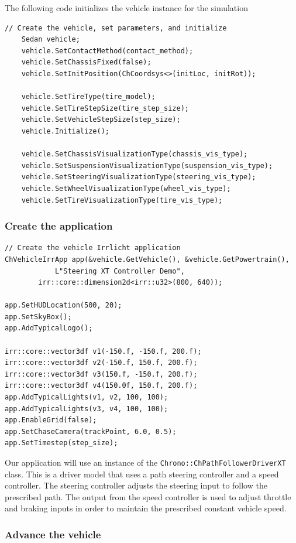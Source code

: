 The following code initializes the vehicle instance for the simulation

\begin{lstlisting}
// Create the vehicle, set parameters, and initialize
    Sedan vehicle;
    vehicle.SetContactMethod(contact_method);
    vehicle.SetChassisFixed(false);
    vehicle.SetInitPosition(ChCoordsys<>(initLoc, initRot));
    
    vehicle.SetTireType(tire_model);
    vehicle.SetTireStepSize(tire_step_size);
    vehicle.SetVehicleStepSize(step_size);
    vehicle.Initialize();

    vehicle.SetChassisVisualizationType(chassis_vis_type);
    vehicle.SetSuspensionVisualizationType(suspension_vis_type);
    vehicle.SetSteeringVisualizationType(steering_vis_type);
    vehicle.SetWheelVisualizationType(wheel_vis_type);
    vehicle.SetTireVisualizationType(tire_vis_type);
\end{lstlisting}


\subsubsection{Create the application}

\begin{lstlisting}
// Create the vehicle Irrlicht application
ChVehicleIrrApp app(&vehicle.GetVehicle(), &vehicle.GetPowertrain(), 
		    L"Steering XT Controller Demo", 
        irr::core::dimension2d<irr::u32>(800, 640));

app.SetHUDLocation(500, 20);
app.SetSkyBox();
app.AddTypicalLogo();

irr::core::vector3df v1(-150.f, -150.f, 200.f);
irr::core::vector3df v2(-150.f, 150.f, 200.f);
irr::core::vector3df v3(150.f, -150.f, 200.f);
irr::core::vector3df v4(150.0f, 150.f, 200.f); 
app.AddTypicalLights(v1, v2, 100, 100);
app.AddTypicalLights(v3, v4, 100, 100);
app.EnableGrid(false);
app.SetChaseCamera(trackPoint, 6.0, 0.5);
app.SetTimestep(step_size);
\end{lstlisting}

Our application will use an instance of the \lstinline{Chrono::ChPathFollowerDriverXT} class. This is a driver model that uses a path steering controller and a speed controller. The steering controller adjusts the steering input to follow the prescribed path. 
The output from the speed controller is used to adjust throttle and braking inputs in order to maintain the prescribed constant vehicle speed.


\subsubsection{Advance the vehicle}

